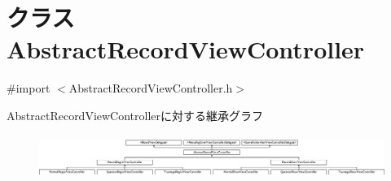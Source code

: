 \hypertarget{interface_abstract_record_view_controller}{
\section{クラス AbstractRecordViewController}
\label{interface_abstract_record_view_controller}
}


{\ttfamily \#import $<$AbstractRecordViewController.h$>$}

AbstractRecordViewControllerに対する継承グラフ\begin{figure}[H]
\begin{center}
\leavevmode
\includegraphics[height=1.419518cm]{interface_abstract_record_view_controller}
\end{center}
\end{figure}
